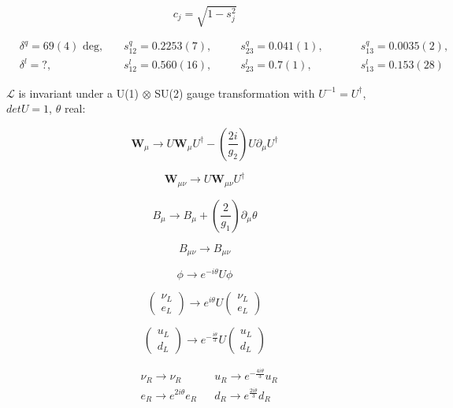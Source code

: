 \documentclass[12pt,a4paper,pagesize=pdftex]{scrartcl}
\newcommand{\icol}[1]{%
  \left(\begin{smallmatrix}#1\end{smallmatrix}\right)%
}
\begin{document}
\begin{equation*}
	c_j=\sqrt{1-s_j^2}
\end{equation*}

\begin{align*}
	&\delta^q=69(4)\text{ deg, } &&s_{12}^q=0.2253(7)\text{, } &&&s_{23}^q=0.041(1)\text{, } &&&&s_{13}^q=0.0035(2),\\
	&\delta^l=?\text{, } &&s_{12}^l=0.560(16)\text{, } &&&s_{23}^l=0.7(1)\text{, } &&&&s_{13}^l=0.153(28)
\end{align*}

$\mathcal{L}$ is invariant under a U(1) $\otimes$ SU(2) gauge transformation with $U^{-1}=U^\dagger$, $detU=1$, $\theta$ real:

\begin{equation*}
	\mathbf{W}_\mu\rightarrow U\mathbf{W}_\mu U^\dagger - \left(\frac{2i}{g_2}\right)U\partial_\mu U^\dagger
\end{equation*}

\begin{equation*}
	\mathbf{W}_{\mu\nu}\rightarrow U\mathbf{W}_{\mu\nu} U^\dagger
\end{equation*}

\begin{equation*}
	B_\mu\rightarrow B_\mu + \left(\frac{2}{g_1}\right)\partial_\mu\theta
\end{equation*}

\begin{equation*}
	B_{\mu\nu}\rightarrow B_{\mu\nu}
\end{equation*}

\begin{equation*}
	\phi\rightarrow e^{-i\theta}U\phi
\end{equation*}

\begin{equation*}
	\icol{\nu_L\\e_L}\rightarrow e^{i\theta}U\icol{\nu_L\\e_L}
\end{equation*}

\begin{equation*}
	\icol{u_L\\d_L}\rightarrow e^{-\frac{i\theta}{3}}U\icol{u_L\\d_L}
\end{equation*}

\begin{align*}
	&\nu_R\rightarrow \nu_R && u_R\rightarrow e^{-\frac{4i\theta}{3}}u_R \\
	&e_R\rightarrow e^{2i\theta}e_R && d_R\rightarrow e^{\frac{2i\theta}{3}}d_R
\end{align*}
\end{document}
